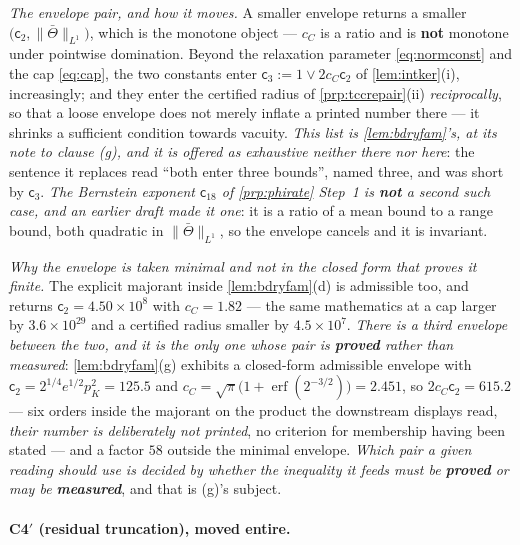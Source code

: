 \medskip
\noindent
\emph{The envelope pair, and how it moves.} A smaller envelope returns a smaller
$\big(\mathsf c_2,\|\bar\Theta\|_{L^{1}}\big)$, which is the monotone object --- $c_C$ is a ratio and is
\textbf{not} monotone under pointwise domination. Beyond the relaxation parameter \eqref{eq:normconst}
and the cap \eqref{eq:cap}, the two constants enter $\mathsf c_3:=1\vee2c_C\mathsf c_2$ of
\cref{lem:intker}\textup{(i)}, increasingly; and they enter the certified radius of
\cref{prp:tccrepair}\textup{(ii)} \emph{reciprocally}, so that a loose envelope does not merely inflate a
printed number there --- it shrinks a sufficient condition towards vacuity. \emph{This list is
\cref{lem:bdryfam}'s, at its note to clause \textup{(g)}, and it is offered as exhaustive neither there
nor here}: the sentence it replaces read ``both enter three bounds'', named three, and was short by
$\mathsf c_3$. \emph{The Bernstein exponent $\mathsf c_{18}$ of \cref{prp:phirate} Step~1 is
\textbf{not} a second such case, and an earlier draft made it one}: it is a ratio of a mean bound to a
range bound, both quadratic in $\|\bar\Theta\|_{L^{1}}$, so the envelope cancels and it is invariant.

\emph{Why the envelope is taken minimal and not in the closed form that proves it finite.} The explicit
majorant inside \cref{lem:bdryfam}\textup{(d)} is admissible too, and returns
$\mathsf c_2=4.50\times10^{8}$ with $c_C=1.82$ --- the same mathematics at a cap larger by
$3.6\times10^{29}$ and a certified radius smaller by $4.5\times10^{7}$. \emph{There is a third envelope
between the two, and it is the only one whose pair is \textbf{proved} rather than measured}:
\cref{lem:bdryfam}\textup{(g)} exhibits a closed-form admissible envelope with
$\mathsf c_2=2^{1/4}e^{1/2}p_K^{2}=125.5$ and $c_C=\sqrt\pi\big(1+\operatorname{erf}(2^{-3/2})\big)=2.451$,
so $2c_C\mathsf c_2=615.2$ --- six orders inside the majorant on the product the downstream displays
read, \emph{their number is deliberately not printed}, no criterion for membership having been stated
--- and a factor $58$ outside the minimal envelope. \emph{Which pair a given reading should use is
decided by whether the inequality it feeds must be \textbf{proved} or may be \textbf{measured}}, and
that is \textup{(g)}'s subject.

\paragraph{C4$'$ (residual truncation), moved entire.}

